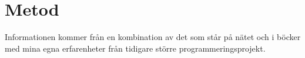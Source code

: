 \section{Metod}
Informationen kommer från en kombination av det som står på nätet och i böcker med mina egna erfarenheter från tidigare större programmeringsprojekt.

 
